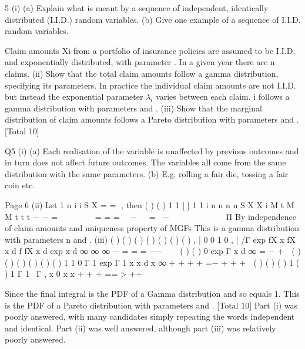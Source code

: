 \documentclass[a4paper,12pt]{article}
\begin{document}
 

5 (i) (a) Explain what is meant by a sequence of independent, identically
distributed (I.I.D.) random variables.
(b) Give one example of a sequence of I.I.D. random variables.

Claim amounts Xi from a portfolio of insurance policies are assumed to be I.I.D. and
exponentially distributed, with parameter \lambda  . In a given year there are n claims.
(ii) Show that the total claim amounts follow a gamma distribution, specifying its parameters. 
In practice the individual claim amounts are not I.I.D. but instead the exponential parameter $\lambda_{i}$ varies between each claim. \lambda  i follows a gamma distribution with parameters \alpha  and \beta .
(iii) Show that the marginal distribution of claim amounts follows a Pareto distribution with parameters \alpha  and \beta . 
[Total 10]
\item


\newpage
  Q5 (i) (a) Each realisation of the variable is unaffected by previous outcomes and
in turn does not affect future outcomes. 
The variables all come from the same distribution with the same
parameters. 
(b) E.g. rolling a fair die, tossing a fair coin etc. 

Page 6
(ii) Let
1
n
i
i
S X
=
  = , then
( ) ( )
1
1
[ ] 1 1 i
n n n
n
S X X
i
M t M M t t t
− −
=
        = = =  −   = −    \lambda      \lambda    
Π 
By independence of claim amounts and uniqueness property of MGFs 
This is a gamma distribution with parameters n and \lambda   . 
(iii) ( ) ( ) ( ) ( )
( ) ( ) ( )
, |
  0 0
1
0
, |
  /Γ exp
fX x fX x d f fX x d
exp x d
∞ ∞
\lambda   \lambda   \lambda  
∞
\alpha  \alpha −
= \lambda   \lambda  = \lambda   \lambda   \lambda  
= \beta  \alpha  \lambda   −\beta \lambda   \lambda   −\lambda   \lambda  
 

( ) { ( ) }
0
exp
Γ
x d
\alpha  ∞
= \beta  \lambda  \alpha  − + \beta  \lambda   \lambda  
\alpha   
( ) ( )
( )
( )
( ) { ( ) }
1
1
0
Γ 1
\Γ exp
Γ 1
x
x d
x
∞ \alpha +
  \alpha  \alpha 
\alpha +
  \alpha  + +\beta 
=\beta  \alpha  \lambda   − + \beta  \lambda   \lambda  
+ \beta  \alpha  +  
( ) ( )
( ) 1 ( ) 1
Γ 1
\ Γ , x 0
x x
\alpha 
\alpha 
\alpha + \alpha +
  \alpha  + \alpha \beta  =\beta  \alpha  = >
  +\beta  +\beta 

Since the final integral is the PDF of a Gamma distribution and so equals 1.
This is the PDF of a Pareto distribution with parameters \alpha  and \beta  . 
[Total 10]
Part (i) was poorly answered, with many candidates simply repeating the
words independent and identical. Part (ii) was well answered, although part
(iii) was relatively poorly answered.
\end{document}
